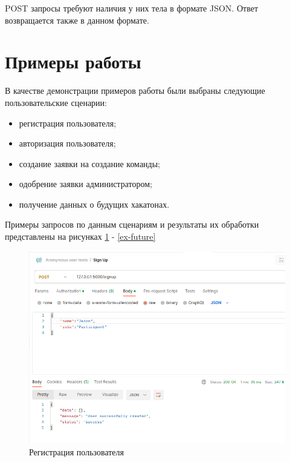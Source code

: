 POST запросы требуют наличия у них тела в формате JSON\cite{json}. Ответ возвращается также в данном формате.


\section{Примеры работы}
В качестве демонстрации примеров работы были выбраны следующие пользовательские сценарии:

\begin{itemize}
    \item регистрация пользователя;
    \item авторизация пользователя;
    \item создание заявки на создание команды;
    \item одобрение заявки администратором;
    \item получение данных о будущих хакатонах.
\end{itemize}

Примеры запросов по данным сценариям и результаты их обработки представлены на рисунках \ref{ex-signup} - \ref{ex-future}

\begin{figure}[H]
	\begin{center}
		\includegraphics[page=1,scale=0.5]{assets/ex-signup.png}
	\end{center}
	\caption{Регистрация пользователя}
	\label{ex-signup}
\end{figure}

